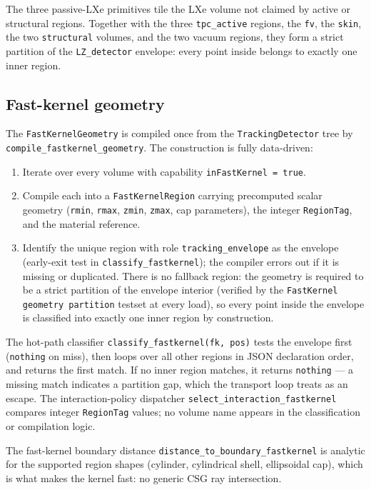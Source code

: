 \documentclass[11pt]{article}
\begin{document}
The three passive-LXe primitives tile the LXe volume not claimed by active
or structural regions. Together with the three \texttt{tpc\_active} regions,
the \texttt{fv}, the \texttt{skin}, the two \texttt{structural} volumes,
and the two vacuum regions, they form a strict partition of the
\texttt{LZ\_detector} envelope: every point inside belongs to exactly one
inner region.

\subsection{Fast-kernel geometry}
\label{sec:geometry-fastkernel}

The \texttt{FastKernelGeometry} is compiled once from the
\texttt{TrackingDetector} tree by \texttt{compile\_fastkernel\_geometry}. The
construction is fully data-driven:

\begin{enumerate}[label=\arabic*.]
\item Iterate over every volume with capability \texttt{inFastKernel = true}.
\item Compile each into a \texttt{FastKernelRegion} carrying precomputed
scalar geometry (\texttt{rmin}, \texttt{rmax}, \texttt{zmin}, \texttt{zmax},
cap parameters), the integer \texttt{RegionTag}, and the material reference.
\item Identify the unique region with role \texttt{tracking\_envelope} as
the envelope (early-exit test in \texttt{classify\_fastkernel}); the
compiler errors out if it is missing or duplicated. There is no fallback
region: the geometry is required to be a strict partition of the envelope
interior (verified by the \texttt{FastKernel geometry partition} testset
at every load), so every point inside the envelope is classified into
exactly one inner region by construction.
\end{enumerate}

The hot-path classifier \texttt{classify\_fastkernel(fk, pos)} tests the
envelope first (\texttt{nothing} on miss), then loops over all other regions
in JSON declaration order, and returns the first match. If no inner region
matches, it returns \texttt{nothing} --- a missing match indicates a partition
gap, which the transport loop treats as an escape. The interaction-policy
dispatcher
\texttt{select\_interaction\_fastkernel} compares integer
\texttt{RegionTag} values; no volume name appears in the classification or
compilation logic.

The fast-kernel boundary distance \texttt{distance\_to\_boundary\_fastkernel}
is analytic for the supported region shapes (cylinder, cylindrical shell,
ellipsoidal cap), which is what makes the kernel fast: no generic CSG ray
intersection.
\end{document}

